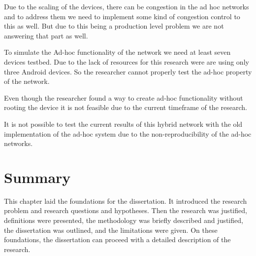 \vspace{12pt}
Due to the scaling of the devices, there can be congestion in the ad hoc networks and to address them we need to implement some kind of congestion control to this as well. But due to this being a production level problem we are not answering that part as well.

\vspace{12pt}
To simulate the Ad-hoc functionality of the network we need at least seven devices testbed. Due to the lack of resources for this research were are using only three Android devices. So the researcher cannot properly test the ad-hoc property of the network.

\vspace{12pt}
Even though the researcher found a way to create ad-hoc functionality without rooting the device it is not feasible due to the current timeframe of the research. 

\vspace{12pt}
It is not possible to test the current results of this hybrid network with the old implementation of the ad-hoc system due to the non-reproducibility of the ad-hoc networks.

\vspace{12pt}


\section{Summary}
This chapter laid the foundations for the dissertation. It introduced the research problem and research questions and hypotheses. Then the research was justified, definitions were presented, the methodology was briefly described and justified, the dissertation was outlined, and the limitations were given. On these foundations, the dissertation can proceed with a detailed description of the research.
\vspace{12pt}
\vspace{12pt}
\clearpage








